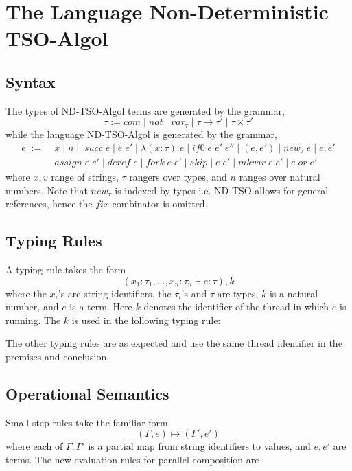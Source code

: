 \documentclass{article}
\begin{document}
\section{The Language Non-Deterministic TSO-Algol}
\subsection{Syntax}
The types of ND-TSO-Algol terms are generated by the grammar,
$$\tau := com \; | \; nat \; | \; var_{\tau} \; | \; \tau \rightarrow \tau' \; | \;
\tau \times \tau'$$
while the language ND-TSO-Algol is generated by the grammar,
\begin{align*}
e \; := \; &x \; | \; n \; | \; \; succ \; e \; | \; e \; e' \; | \;
\lambda (x:\tau).e \; | \; if0 \; e \; e' \; e'' \; | \; (e,
e') \; | \; new_{\tau} \; e \; | \; e;e'\\
&assign \; e \; e' \; | \; deref \; e \; |
\; fork \; e \; e' \; | \; skip \; | \; e \; e' \; | \; mkvar \; e \; e' \; | \;
e \; or \; e'
\end{align*}
where $x,v$ range of strings, $\tau$ rangers over types, and $n$ ranges over
natural numbers. Note that $new_{\tau}$ is indexed by types i.e. ND-TSO allows for general references, hence the $fix$ combinator is omitted.
\subsection{Typing Rules}
A typing rule takes the form 
$$(x_1 : \tau_1, \ldots, x_n:\tau_n \vdash e : \tau), k$$
where the $x_i$'s are string identifiers, the $\tau_i$'s and $\tau$ are types,
$k$ is a natural number, and $e$ is a term. Here $k$ denotes the identifier of
the thread in which $e$ is running. The $k$ is used in the following typing
rule:
\begin{prooftree}
\end{prooftree}
The other typing rules are as expected and use the same thread identifier in the
premises and conclusion.
\subsection{Operational Semantics}
Small step rules take the familiar form
$$(\Gamma, e) \mapsto (\Gamma', e')$$
where each of $\Gamma, \Gamma'$ is a partial map from string identifiers to values, and $e, e'$ are terms. The new
evaluation rules for parallel composition are
\begin{prooftree}
\end{prooftree}
\begin{prooftree}
\end{prooftree}
\begin{prooftree}
\end{prooftree}
\end{document}
